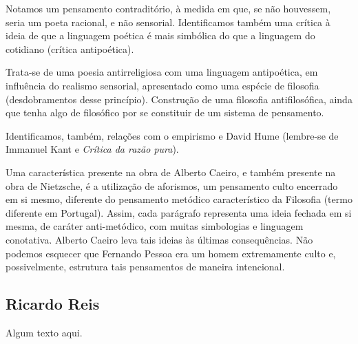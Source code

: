 Notamos um pensamento contraditório, à medida em que, se não houvessem, seria um poeta racional, e não sensorial. Identificamos também uma crítica à ideia de que a linguagem poética é mais simbólica do que a linguagem do cotidiano (crítica antipoética).

Trata-se de uma poesia antirreligiosa com uma linguagem antipoética, em influência do realismo sensorial, apresentado como uma espécie de filosofia (desdobramentos desse princípio). Construção de uma filosofia antifilosófica, ainda que tenha algo de filosófico por se constituir de um sistema de pensamento.

Identificamos, também, relações com o empirismo e David Hume (lembre-se de Immanuel Kant e \textit{Crítica da razão pura}).

Uma característica presente na obra de Alberto Caeiro, e também presente na obra de Nietzsche, é a utilização de aforismos, um pensamento culto encerrado em si mesmo, diferente do pensamento metódico característico da Filosofia (termo diferente em Portugal). Assim, cada parágrafo representa uma ideia fechada em si mesma, de caráter anti-metódico, com muitas simbologias e linguagem conotativa. Alberto Caeiro leva tais ideias às últimas consequências. Não podemos esquecer que Fernando Pessoa era um homem extremamente culto e, possivelmente, estrutura tais pensamentos de maneira intencional.

\subsection{Ricardo Reis}

Algum texto aqui.

